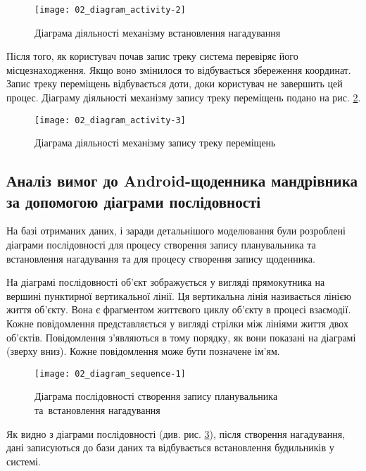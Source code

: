 \documentclass[../main.tex]{subfiles}
\begin{document}
\begin{figure}[H]
	\centering
	\texttt{[image: 02\_diagram\_activity-2]}
	\caption{Діаграма діяльності механізму встановлення нагадування}
	\label{diagram:activity_reminder}
\end{figure}

Після того, як користувач почав запис треку система перевіряє його місцезнаходження. Якщо воно змінилося то відбувається збереження координат. Запис треку переміщень відбувається доти, доки користувач не завершить цей процес. Діаграму діяльності механізму запису треку переміщень подано на рис. \ref{diagram:activity_tracking}.

\begin{figure}[H]
	\centering
	\texttt{[image: 02\_diagram\_activity-3]}
	\caption{Діаграма діяльності механізму запису треку переміщень}
	\label{diagram:activity_tracking}
\end{figure}

\subsection{Аналіз вимог до Android-щоденника мандрівника за допомогою діаграми послідовності}
На базі отриманих даних, і заради детальнішого моделювання були розроблені діаграми послідовності для процесу створення запису планувальника та встановлення нагадування та для процесу створення запису щоденника.

На діаграмі послідовності об’єкт зображується у вигляді прямокутника на вершині пунктирної вертикальної лінії. Ця вертикальна лінія називається лінією життя об’єкту. Вона є фрагментом життєвого циклу об’єкту в процесі взаємодії. Кожне повідомлення представляється у вигляді стрілки між лініями життя двох об’єктів. Повідомлення з’являються в тому порядку, як вони показані на діаграмі (зверху вниз). Кожне повідомлення може бути позначене ім’ям.

\begin{figure}[H]
	\centering
	\texttt{[image: 02\_diagram\_sequence-1]}
	\caption{Діаграма послідовності створення запису планувальника та~встановлення нагадування} 
	\label{diagram:sequence_reminder}
\end{figure}

Як видно з діаграми послідовності (див. рис. \ref{diagram:sequence_reminder}), після створення нагадування, дані записуються до бази даних та відбувається встановлення будильників у системі. 
\end{document}
